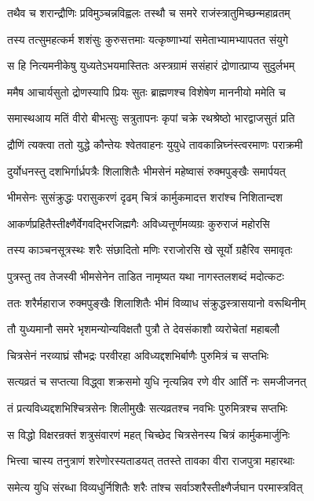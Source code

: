 \twolineshloka
{तथैव च शरान्द्रौणिः प्रविमुञ्चन्नविह्वलः}
{तस्थौ च समरे राजंस्त्रातुमिच्छन्महाव्रतम्}


\twolineshloka
{तस्य तत्सुमहत्कर्म शशंसुः कुरुसत्तमाः}
{यत्कृष्णाभ्यां समेताभ्यामभ्यापतत संयुगे}


\twolineshloka
{स हि नित्यमनीकेषु युध्यतेऽभयमास्तितः}
{अस्त्रग्रामं ससंहारं द्रोणात्प्राप्य सुदुर्लभम्}


\twolineshloka
{ममैष आचार्यसुतो द्रोणस्यापि प्रियः सुतः}
{ब्राह्मणश्च विशेषेण माननीयो ममेति च}


\twolineshloka
{समास्थआय मतिं वीरो बीभत्सुः सत्रुतापनः}
{कृपां चक्रे रथश्रेष्ठो भारद्वाजसुतं प्रति}


\twolineshloka
{द्रौणिं त्यक्त्वा ततो युद्धे कौन्तेयः श्वेतवाहनः}
{युयुधे तावकान्निघ्नंस्त्वरमाणः पराक्रमी}


\twolineshloka
{दुर्योधनस्तु दशभिर्गार्ध्रपत्रैः शिलाशितैः}
{भीमसेनं महेष्वासं रुक्मपुङ्खैः समार्पयत्}


\twolineshloka
{भीमसेनः सुसंक्रुद्धः परासुकरणं दृढम्}
{चित्रं कार्मुकमादत्त शरांश्च निशितान्दश}


\twolineshloka
{आकर्णप्रहितैस्तीक्ष्णैर्वेगवद्भिरजिह्मगैः}
{अविध्यत्तूर्णमव्यग्रः कुरुराजं महोरसि}


\twolineshloka
{तस्य काञ्चनसूत्रस्थः शरैः संछादितो मणिः}
{रराजोरसि खे सूर्यो ग्रहैरिव समावृतः}


\twolineshloka
{पुत्रस्तु तव तेजस्वी भीमसेनेन ताडित}
{नामृष्यत यथा नागस्तलशब्दं मदोत्कटः}


\twolineshloka
{ततः शरैर्महाराज रुक्मपुङ्खैः शिलाशितैः}
{भीमं विव्याध संक्रुद्धस्त्रासयानो वरूथिनीम्}


\twolineshloka
{तौ युध्यमानौ समरे भृशमन्योन्यविक्षतौ}
{पुत्रौ ते देवसंकाशौ व्यरोचेतां महाबलौ}


\twolineshloka
{चित्रसेनं नरव्याघ्रं सौभद्रः परवीरहा}
{अविध्यद्दशभिर्बाणैः पुरुमित्रं च सप्तभिः}


\twolineshloka
{सत्यव्रतं च सप्तत्या विद्ध्वा शक्रसमो युधि}
{नृत्यन्निव रणे वीर आर्तिं नः समजीजनत्}


\twolineshloka
{तं प्रत्यविध्यद्दशभिश्चित्रसेनः शिलीमुखैः}
{सत्यव्रतश्च नवभिः पुरुमित्रश्च सप्तभिः}


\twolineshloka
{स विद्धो विक्षरन्रक्तं शत्रुसंवारणं महत्}
{चिच्छेद चित्रसेनस्य चित्रं कार्मुकमार्जुनिः}


\twolineshloka
{भित्त्वा चास्य तनुत्राणं शरेणोरस्यताडयत्}
{ततस्ते तावका वीरा राजपुत्रा महारथाः}


\twolineshloka
{समेत्य युधि संरब्धा विव्यधुर्निशितैः शरैः}
{तांश्च सर्वाञ्शरैस्तीक्ष्णैर्जघान परमास्त्रवित्}


